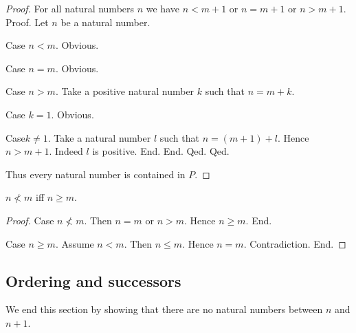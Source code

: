 \documentclass[../../arithmetic.ftl.tex]{subfiles}
\begin{document}
\begin{forthel}
\begin{proof}
        For all natural numbers $n$ we have $n < m + 1$ or $n = m + 1$ or $n > m + 1$. \\
        Proof.
          Let $n$ be a natural number.

          Case $n < m$. Obvious.

          Case $n = m$. Obvious.

          Case $n > m$.
            Take a positive natural number $k$ such that $n = m + k$.

            Case $k = 1$. Obvious.

            Case$k \neq 1$.
              Take a natural number $l$ such that $n = (m + 1) + l$.
              Hence $n > m + 1$.
              Indeed $l$ is positive.
            End.
          End.
        Qed.
      Qed.

      Thus every natural number is contained in $P$.
    \end{proof}


    \begin{proposition}\label{Arithmetic_02_01_112345}
      $n \nless m$ iff $n \geq m$.
    \end{proposition}
    \begin{proof}
      Case $n \nless m$.
        Then $n = m$ or $n > m$.
        Hence $n \geq m$.
      End.

      Case $n \geq m$.
        Assume $n < m$.
        Then $n \leq m$.
        Hence $n = m$.
        Contradiction.
      End.
    \end{proof}
  \end{forthel}


  \subsection{Ordering and successors}

  We end this section by showing that there are no natural numbers
  between $n$ and $n + 1$.
\end{document}

